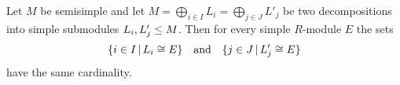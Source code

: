 

%   
%   


\begin{theorem}
  \label{theorem: multiplicity well-defined}
  Let $M$ be semisimple and let $M = \bigoplus_{i \in I} L_i = \bigoplus_{j \in J} L'_j$ be two decompositions into simple submodules $L_i, L'_j \leq M$.
  Then for every simple $R$-module $E$ the sets
  \[
    \{ i \in I \suchthat L_i \cong E \}
    \quad\text{and}\quad
    \{ j \in J \suchthat L'_j \cong E \}
  \]
  have the same cardinality.
\end{theorem}


